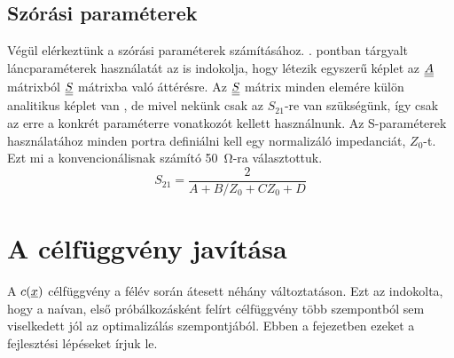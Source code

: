 	\subsection{Szórási paraméterek}
        Végül elérkeztünk a szórási paraméterek számításához. . pontban tárgyalt láncparaméterek használatát az is indokolja, hogy létezik egyszerű képlet az $\underline{\underline{A}}$ mátrixból $\underline{\underline{S}}$ mátrixba való áttérésre. Az $\underline{\underline{S}}$ mátrix minden elemére külön analitikus képlet van \cite{lancpar_spar}, de mivel nekünk csak az $S_{21}$-re van szükségünk, így csak az erre a konkrét paraméterre vonatkozót kellett használnunk. Az S-paraméterek használatához minden portra definiálni kell egy normalizáló impedanciát, $Z_0$-t. Ezt mi a konvencionálisnak számító \SI{50}{\ohm}-ra választottuk. 
    \begin{equation}
        S_{21} = \dfrac{2}{A+B/Z_0+CZ_0+D}
    \end{equation}
\section{A célfüggvény javítása}
    \label{sec:celfuggveny_javitas}
    A $c(\underline{x})$ célfüggvény a félév során átesett néhány változtatáson. Ezt az indokolta, hogy a naívan, első próbálkozásként felírt célfüggvény több szempontból sem viselkedett jól az optimalizálás szempontjából. Ebben a fejezetben ezeket a fejlesztési lépéseket írjuk le.
